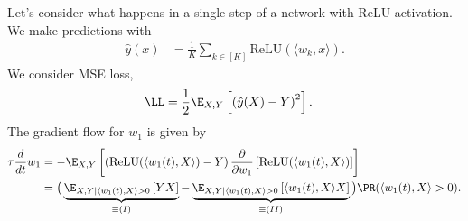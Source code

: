 \documentclass{article}
\begin{document}
Let's consider what happens in a single step of a network with ReLU activation.
We make predictions with
\begin{align}
  \hat{y}(x) &= \frac{1}{K} \sum_{k \in [K]} \text{ReLU}(\langle w_k, x \rangle).
\end{align}
We consider MSE loss,
\begin{align}
  \LL &= \frac{1}{2} \E_{X,Y} \left[ \left( \hat{y}(X) - Y \right)^2 \right].
\end{align}
The gradient flow for $w_1$ is given by
\begin{align}
  \tau \frac{d}{dt} w_1
  &= -\E_{X,Y} \left[ \left( \text{ReLU}(\langle w_1(t), X \rangle) - Y \right) \frac{\partial}{\partial w_1} \left[ \text{ReLU}(\langle w_1(t), X \rangle) \right] \right] \\
  &= \big( \underbrace{ \E_{X, Y \mid \langle w_1(t), X \rangle > 0} \left[ Y X \right] }_{\equiv (I)} - \underbrace{ \E_{X, Y \mid \langle w_1(t), X \rangle > 0} \left[ \langle w_1(t), X \rangle X \right] }_{\equiv (II)} \big) \PR( \langle w_1(t), X \rangle > 0 ).
\end{align}
\end{document}
